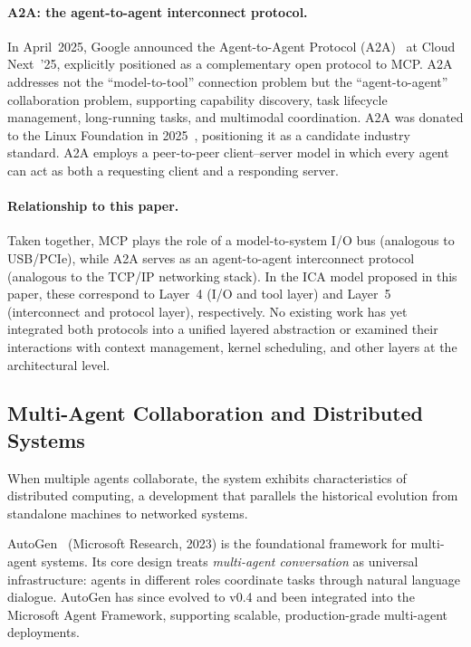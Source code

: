 \paragraph{A2A: the agent-to-agent interconnect protocol.}
In April~2025, Google announced the Agent-to-Agent Protocol (A2A)~\cite{google_a2a_2025} at Cloud Next~'25, explicitly positioned as a complementary open protocol to MCP.
A2A addresses not the ``model-to-tool'' connection problem but the ``agent-to-agent'' collaboration problem, supporting capability discovery, task lifecycle management, long-running tasks, and multimodal coordination.
A2A was donated to the Linux Foundation in 2025~\cite{a2alinux2025}, positioning it as a candidate industry standard.
A2A employs a peer-to-peer client--server model in which every agent can act as both a requesting client and a responding server.

\paragraph{Relationship to this paper.}
Taken together, MCP plays the role of a model-to-system I/O bus (analogous to USB/PCIe), while A2A serves as an agent-to-agent interconnect protocol (analogous to the TCP/IP networking stack).
In the ICA model proposed in this paper, these correspond to Layer~4 (I/O and tool layer) and Layer~5 (interconnect and protocol layer), respectively.
No existing work has yet integrated both protocols into a unified layered abstraction or examined their interactions with context management, kernel scheduling, and other layers at the architectural level.

\subsection{Multi-Agent Collaboration and Distributed Systems}
\label{sec:related-multiagent}

When multiple agents collaborate, the system exhibits characteristics of distributed computing, a development that parallels the historical evolution from standalone machines to networked systems.

AutoGen~\cite{wu2023autogen} (Microsoft Research, 2023) is the foundational framework for multi-agent systems.
Its core design treats \textit{multi-agent conversation} as universal infrastructure: agents in different roles coordinate tasks through natural language dialogue.
AutoGen has since evolved to v0.4 and been integrated into the Microsoft Agent Framework, supporting scalable, production-grade multi-agent deployments.

